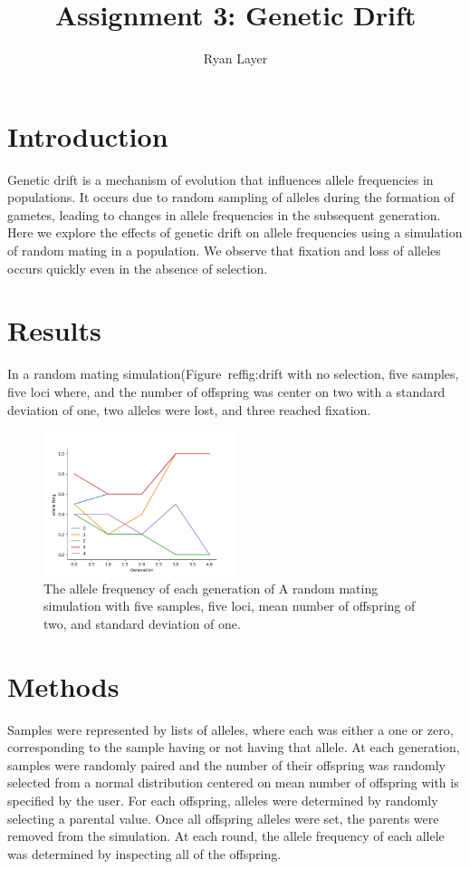 \documentclass[11pt, letterpaper]{article}
\begin{document}
\title{Assignment 3: Genetic Drift}
\author{Ryan Layer}
\maketitle

\section{Introduction}
Genetic drift is a mechanism of evolution that influences allele frequencies in
populations. It occurs due to random sampling of alleles during the formation
of gametes, leading to changes in allele frequencies in the subsequent
generation. Here we explore the effects of genetic drift on allele frequencies
using a simulation of random mating in a population. We observe that fixation
and loss of alleles occurs quickly even in the absence of selection.

\section{Results}
In a random mating simulation(Figure~ref{fig:drift} with no selection, five
samples, five loci where, and the number of offspring was center on two with a
standard deviation of one, two alleles were lost, and three reached fixation.

\begin{figure}[h]
    \centering
    \includegraphics[width=0.5\textwidth]{fig1}
    \caption{The allele frequency of each generation of A random mating
    simulation with five samples, five loci, mean number of offspring of two,
    and standard deviation of one.}
    \label{fig:drift}
\end{figure}

\section{Methods}

Samples were represented by lists of alleles, where each was either a one or
zero, corresponding to the sample having or not having that allele. At each
generation, samples were randomly paired and the number of their offspring was
randomly selected from a normal distribution centered on mean number of
offspring with is specified by the user. For each offspring, alleles were
determined by randomly selecting a parental value. Once all offspring alleles
were set, the parents were removed from the simulation. At each round, the
allele frequency of each allele was determined by inspecting all of the
offspring.
\end{document}
